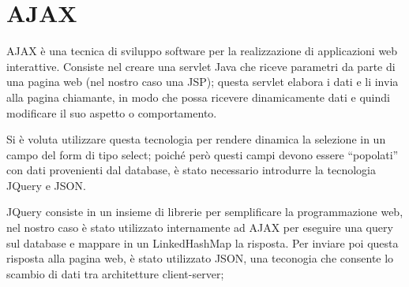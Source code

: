 \documentclass[a4paper,10pt]{article}
\begin{document}
 \section{AJAX}
 AJAX è una tecnica di sviluppo software per la realizzazione di applicazioni web interattive. Consiste nel creare una servlet Java che riceve parametri da parte 
 di una pagina web (nel nostro caso una JSP); questa servlet elabora i dati e li invia alla pagina chiamante, 
 in modo che possa ricevere dinamicamente dati e quindi modificare il suo aspetto o comportamento.
 
 Si è voluta utilizzare questa tecnologia per rendere dinamica la selezione in un campo del form di tipo select; 
 poiché però questi campi devono essere ``popolati'' con dati provenienti dal database, è stato necessario introdurre la tecnologia JQuery e JSON.
 
 JQuery consiste in un insieme di librerie per semplificare la programmazione web, nel nostro caso è stato utilizzato internamente ad 
 AJAX per eseguire una query sul database e mappare in un LinkedHashMap la risposta. Per inviare poi questa risposta alla pagina web, è stato utilizzato JSON, 
 una teconogia che consente lo scambio di dati tra architetture client-server;
\end{document}
